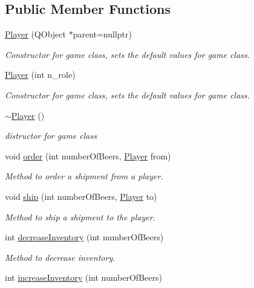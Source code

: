 \subsection*{Public Member Functions}
\begin{DoxyCompactItemize}
\item 
\hyperlink{class_player_a1078e29a9779991ea47528d8b31f32ca}{Player} (Q\+Object $\ast$parent=nullptr)
\begin{DoxyCompactList}\small\item\em Constructor for game class, sets the default values for game class. \end{DoxyCompactList}\item 
\hyperlink{class_player_a8fd722300bd72d1d043e789e7ed2a39b}{Player} (int n\+\_\+role)
\begin{DoxyCompactList}\small\item\em Constructor for game class, sets the default values for game class. \end{DoxyCompactList}\item 
\hyperlink{class_player_a749d2c00e1fe0f5c2746f7505a58c062}{$\sim$\+Player} ()
\begin{DoxyCompactList}\small\item\em distructor for game class \end{DoxyCompactList}\item 
void \hyperlink{class_player_a473d9c248207e213abc5575859a51c1b}{order} (int number\+Of\+Beers, \hyperlink{class_player}{Player} from)
\begin{DoxyCompactList}\small\item\em Method to order a shipment from a player. \end{DoxyCompactList}\item 
void \hyperlink{class_player_a68db574596d1ca040f454d34310149ee}{ship} (int number\+Of\+Beers, \hyperlink{class_player}{Player} to)
\begin{DoxyCompactList}\small\item\em Method to ship a shipment to the player. \end{DoxyCompactList}\item 
int \hyperlink{class_player_ae2197d1061a24fa444129b5ea85996d5}{decrease\+Inventory} (int number\+Of\+Beers)
\begin{DoxyCompactList}\small\item\em Method to decrease inventory. \end{DoxyCompactList}\item 
int \hyperlink{class_player_af67e6ee0de38f3e9635d35849f103449}{increase\+Inventory} (int number\+Of\+Beers)

\end{DoxyCompactItemize}
